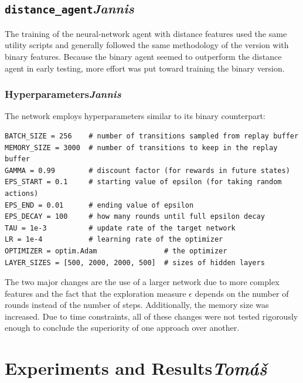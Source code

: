 \documentclass{article}
\begin{document}
\clearpage

\subsection[\texttt{distance\_agent}]{\texttt{distance\_agent}{\normalsize \normalfont \it \hfill Jannis}}

The training of the neural-network agent with distance features used the same utility scripts and generally followed the same methodology of the version with binary features. Because the binary agent seemed to outperform the distance agent in early testing, more effort was put toward training the binary version.

\subsubsection[Hyperparameters]{Hyperparameters{\normalsize \normalfont \it \hfill Jannis}}

The network employs hyperparameters similar to its binary counterpart:

\begin{verbatim}
BATCH_SIZE = 256    # number of transitions sampled from replay buffer
MEMORY_SIZE = 3000  # number of transitions to keep in the replay buffer
GAMMA = 0.99        # discount factor (for rewards in future states)
EPS_START = 0.1     # starting value of epsilon (for taking random actions)
EPS_END = 0.01      # ending value of epsilon
EPS_DECAY = 100     # how many rounds until full epsilon decay
TAU = 1e-3          # update rate of the target network
LR = 1e-4           # learning rate of the optimizer
OPTIMIZER = optim.Adam                # the optimizer
LAYER_SIZES = [500, 2000, 2000, 500]  # sizes of hidden layers
\end{verbatim}

The two major changes are the use of a larger network due to more complex features and the fact that the exploration measure $\epsilon$ depends on the number of rounds instead of the number of steps. Additionally, the memory size was increased. Due to time constraints, all of these changes were not tested rigorously enough to conclude the superiority of one approach over another.

\clearpage

\section[Experiments and Results]{Experiments and Results{\normalsize \normalfont \it \hfill Tomáš}}
\end{document}
